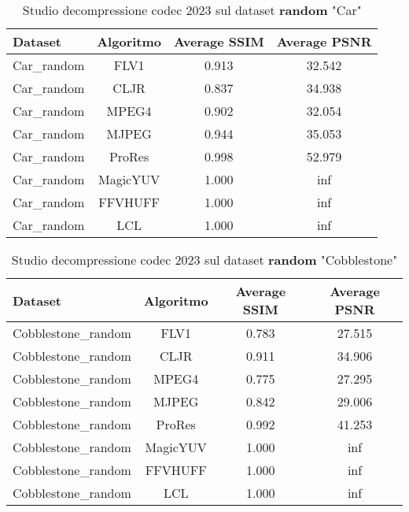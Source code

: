 \begin{table}[!ht]
\centering
\begin{tabular}{|l|c|c|c|}
\hline
Dataset               & Algoritmo & Average SSIM & Average PSNR
\\ \hline
Car\_random           & FLV1      & 0.913        & 32.542       \\ \hline
Car\_random           & CLJR      & 0.837        & 34.938       \\ \hline
Car\_random           & MPEG4     & 0.902        & 32.054       \\ \hline
Car\_random           & MJPEG     & 0.944        & 35.053       \\ \hline
Car\_random           & ProRes    & 0.998        & 52.979       \\ \hline
Car\_random           & MagicYUV  & 1.000        & inf          \\ \hline
Car\_random           & FFVHUFF   & 1.000        & inf          \\ \hline
Car\_random           & LCL       & 1.000        & inf          \\ \hline
\end{tabular}
\caption{Studio decompressione codec 2023 sul dataset \textbf{random} "Car"}
\end{table}

\begin{table}[!ht]
\centering
\begin{tabular}{|l|c|c|c|}
\hline
Dataset               & Algoritmo & Average SSIM & Average PSNR
\\ \hline
Cobblestone\_random   & FLV1      & 0.783        & 27.515       \\ \hline
Cobblestone\_random   & CLJR      & 0.911        & 34.906       \\ \hline
Cobblestone\_random   & MPEG4     & 0.775        & 27.295       \\ \hline
Cobblestone\_random   & MJPEG     & 0.842        & 29.006       \\ \hline
Cobblestone\_random   & ProRes    & 0.992        & 41.253       \\ \hline
Cobblestone\_random   & MagicYUV  & 1.000        & inf          \\ \hline
Cobblestone\_random   & FFVHUFF   & 1.000        & inf          \\ \hline
Cobblestone\_random   & LCL       & 1.000        & inf          \\ \hline
\end{tabular}
\caption{Studio decompressione codec 2023 sul dataset \textbf{random} "Cobblestone"}
\end{table}

